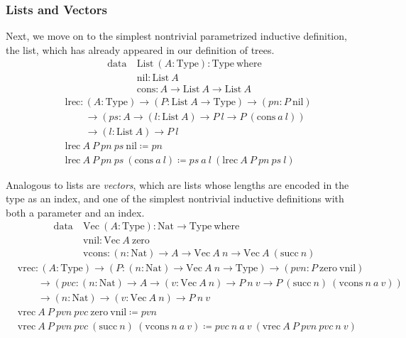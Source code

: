 \documentclass{report}
\newcommand{\Nat}{\const{Nat}}
\newcommand{\zero}{\const{zero}}
\renewcommand{\succ}{\const{succ}}
\newcommand{\List}{\const{List}}
\newcommand{\nil}{\const{nil}}
\newcommand{\cons}{\const{cons}}
\newcommand{\Vector}{\const{Vec}}
\newcommand{\vnil}{\const{vnil}}
\newcommand{\vcons}{\const{vcons}}
\newcommand{\const}[1]{\text{#1}}
\newcommand{\data}{\const{data}}
\newcommand{\Type}{\const{Type}}
\newcommand{\where}{\const{where}}
\begin{document}
\subsubsection{Lists and Vectors}

Next, we move on to the simplest nontrivial parametrized inductive definition, the list, which has already appeared in our definition of trees.
%
\begin{align*}
    \data ~ &\List ~ (A: \Type): \Type ~ \where \\
    &\nil: \List ~ A \\
    &\cons : A \to \List ~ A \to \List ~ A
\end{align*}
\begin{align*}
    &\const{lrec}: (A: \Type) \to (P: \List ~ A \to \Type) \to (pn: P ~ \nil) \\
    &\qquad\to (ps: A \to (l: \List ~ A) \to P ~ l \to P ~ (\cons ~ a ~ l)) \\
    &\qquad\to (l: \List ~ A) \to P ~ l \\
    &\const{lrec} ~ A ~ P ~ pn ~ ps ~ \nil \coloneqq pn \\
    &\const{lrec} ~ A ~ P ~ pn ~ ps ~ (\cons ~ a ~ l) \coloneqq ps ~ a ~ l ~ (\const{lrec} ~ A ~ P ~ pn ~ ps ~ l)
\end{align*}

Analogous to lists are \emph{vectors}, which are lists whose lengths are encoded in the type as an index, and one of the simplest nontrivial inductive definitions with both a parameter and an index.
%
\begin{align*}
    \data ~ &\Vector ~ (A: \Type): \Nat \to \Type ~ \where \\
    &\vnil: \Vector ~ A ~ \zero \\
    &\vcons: (n: \Nat) \to A \to \Vector ~ A ~ n \to \Vector ~ A ~ (\succ ~ n)
\end{align*}
\begin{align*}
    &\const{vrec}: (A: \Type) \to (P: (n: \Nat) \to \Vector ~ A ~ n \to \Type) \to (pvn: P ~ \zero ~ \vnil) \\
    &\qquad\to (pvc: (n: \Nat) \to A \to (v: \Vector ~ A ~ n) \to P ~ n ~ v \to P ~ (\succ ~ n) ~ (\vcons ~ n ~ a ~ v)) \\
    &\qquad\to (n: \Nat) \to (v: \Vector ~ A ~ n) \to P ~ n ~ v \\
    &\const{vrec} ~ A ~ P ~ pvn ~ pvc ~ \zero ~ \vnil \coloneqq pvn \\
    &\const{vrec} ~ A ~ P ~ pvn ~ pvc ~ (\succ ~ n) ~ (\vcons ~ n ~ a ~ v) \coloneqq pvc ~ n ~ a ~ v ~ (\const{vrec} ~ A ~ P ~ pvn ~ pvc ~ n ~ v)
\end{align*}
\end{document}
